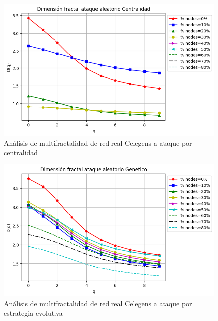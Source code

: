 \begin{figure}[H]
    \centering
    \includegraphics[scale=0.7]{Capitulo6MultifractalidadYRobustez/imagenes/grafica_DqCentrality20180508_020345Celengs.png}
    \caption{Análisis de multifractalidad de red real Celegens a ataque por centralidad}
\end{figure}


\begin{figure}[H]
    \centering
    \includegraphics[scale=0.7]{Capitulo6MultifractalidadYRobustez/imagenes/grafica_DqGenetic20180508_020345Celengs.png}
    \caption{Análisis de multifractalidad de red real Celegens a ataque por estrategia evolutiva}
\end{figure}

